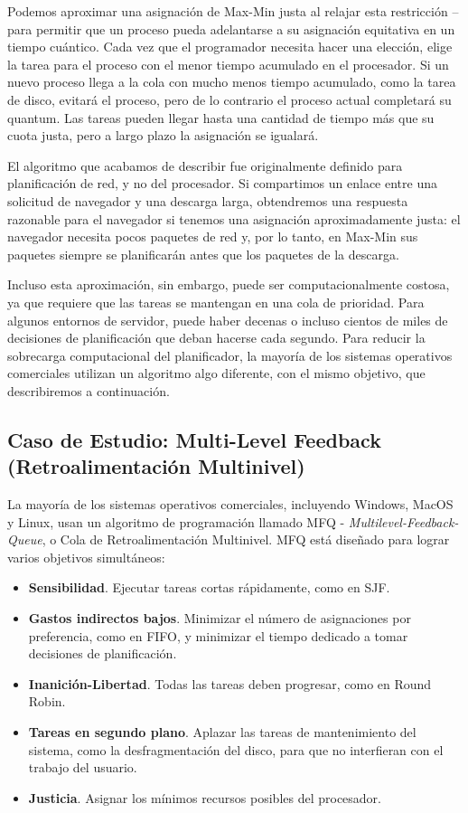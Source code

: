 \documentclass[10pt]{book}
\begin{document}
Podemos aproximar una asignación de Max-Min justa al relajar esta restricción -- para permitir que un proceso pueda adelantarse a su asignación equitativa en un tiempo cuántico. Cada vez que el programador necesita hacer una elección, elige la tarea para el proceso con el menor tiempo acumulado en el procesador. Si un nuevo proceso llega a la cola con mucho menos tiempo acumulado, como la tarea de disco, evitará el proceso, pero de lo contrario el proceso actual completará su quantum. Las tareas pueden llegar hasta una cantidad de tiempo más que su cuota justa, pero a largo plazo la asignación se igualará.

El algoritmo que acabamos de describir fue originalmente definido para planificación de red, y no del procesador. Si compartimos un enlace entre una solicitud de navegador y una descarga larga, obtendremos una respuesta razonable para el navegador si tenemos una asignación aproximadamente justa: el navegador necesita pocos paquetes de red y, por lo tanto, en Max-Min sus paquetes siempre se planificarán antes que los paquetes de la descarga.

Incluso esta aproximación, sin embargo, puede ser computacionalmente costosa, ya que requiere que las tareas se mantengan en una cola de prioridad. Para algunos entornos de servidor, puede haber decenas o incluso cientos de miles de decisiones de planificación que deban hacerse cada segundo. Para reducir la sobrecarga computacional del planificador, la mayoría de los sistemas operativos comerciales utilizan un algoritmo algo diferente, con el mismo objetivo, que describiremos a continuación.

\subsection{Caso de Estudio: Multi-Level Feedback (Retroalimentación Multinivel)}
La mayoría de los sistemas operativos comerciales, incluyendo Windows, MacOS y Linux, usan un algoritmo de programación llamado MFQ - \textit{Multilevel-Feedback-Queue}, o Cola de Retroalimentación Multinivel. MFQ está diseñado para lograr varios objetivos simultáneos:
\begin{itemize}
\item \textbf{Sensibilidad}. Ejecutar tareas cortas rápidamente, como en SJF.
\item \textbf{Gastos indirectos bajos}. Minimizar el número de asignaciones por preferencia, como en FIFO, y minimizar el tiempo dedicado a tomar decisiones de planificación.
\item \textbf{Inanición-Libertad}. Todas las tareas deben progresar, como en Round Robin.
\item \textbf{Tareas en segundo plano}. Aplazar las tareas de mantenimiento del sistema, como la desfragmentación del disco, para que no interfieran con el trabajo del usuario.
\item \textbf{Justicia}. Asignar los mínimos recursos posibles del procesador.
\end{itemize}
\end{document}

